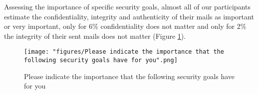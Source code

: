 Assessing the importance of specific security goals, almost all of our participants estimate the confidentiality, integrity and authenticity of their mails as important or very important, only for 6\% confidentiality does not matter and only for 2\% the integrity of their sent mails does not matter (Figure \ref{fig:goals}).\\
\begin{figure}
	\texttt{[image: "figures/Please indicate the importance that the following security goals have for you".png]}
	\centering
	\caption{Please indicate the importance that the following security goals have for you}
	\label{fig:goals}
\end{figure}\\